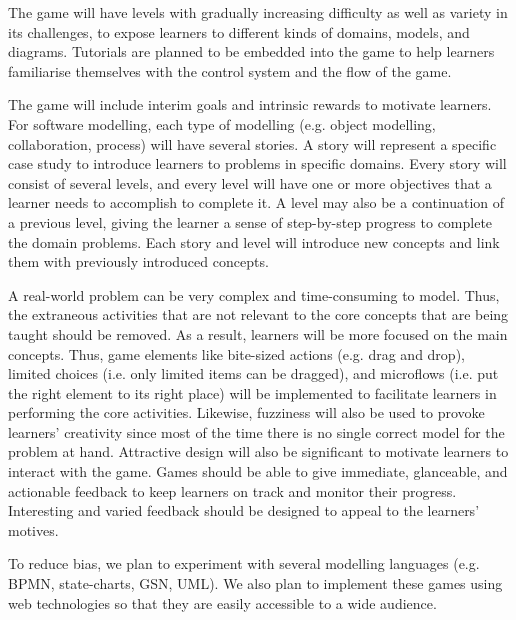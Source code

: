 \documentclass[12pt, a4paper]{report}
\begin{document}
The game will have levels with gradually increasing difficulty as well as variety in its challenges, to expose learners to different kinds of domains, models, and diagrams. Tutorials are planned to be embedded into the game to help learners familiarise themselves with the control system and the flow of the game. 

The game will include interim goals and intrinsic rewards to motivate learners. For software modelling, each type of modelling (e.g. object modelling, collaboration, process) will have several stories. A story will represent a specific case study to introduce learners to problems in specific domains. Every story will consist of several levels, and every level will have one or more objectives that a learner needs to accomplish to complete it. A level may also be a continuation of a previous level, giving the learner a sense of step-by-step progress to complete the domain problems. Each story and level will introduce new concepts and link them with previously introduced concepts.

A real-world problem can be very complex and time-consuming to model. Thus, the extraneous activities that are not relevant to the core concepts that are being taught should be removed. As a result, learners will be more focused on the main concepts. Thus, game elements like bite-sized actions (e.g. drag and drop), limited choices (i.e. only limited items can be dragged), and microflows (i.e. put the right element to its right place) will be implemented to facilitate learners in performing the core activities. Likewise, fuzziness will also be used to provoke learners' creativity since most of the time there is no single correct model for the problem at hand. Attractive design will also be significant to motivate learners to interact with the game. Games should be able to give immediate, glanceable, and actionable feedback to keep learners on track and monitor their progress. Interesting and varied feedback should be designed to appeal to the learners' motives. 

To reduce bias, we plan to experiment with several modelling languages (e.g. BPMN, state-charts, GSN, UML). We also plan to implement these games using web technologies so that they are easily accessible to a wide audience.
\end{document}

